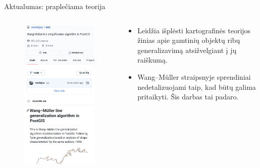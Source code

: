 \documentclass[14pt]{beamer}
\newcommand{\WM}{Wang--M{\"u}ller}
\newcommand{\twocols}[2]
{
    \begin{columns}[c]
        \begin{column}{0.45\textwidth}
            #1
        \end{column}
        \begin{column}{0.55\textwidth}
            #2
        \end{column}
    \end{columns}
}
\begin{document}
\begin{frame}[fragile]{Aktualumas: praplečiama teorija}
  \twocols{
    \begin{figure}[ht]
      \includegraphics[width=.8\textwidth]{github-wm}
    \end{figure}
  }{
    \begin{itemize}
      \item Leidžia išplėsti kartografinės teorijos žinias apie gamtinių
        objektų ribų generalizavimą atsižvelgiant į jų raiškumą.
      \item {\WM} straipsnyje sprendiniai nedetalizuojami taip, kad būtų
        galima pritaikyti. Šis darbas tai padaro.
    \end{itemize}
  }
\end{frame}
\end{document}
